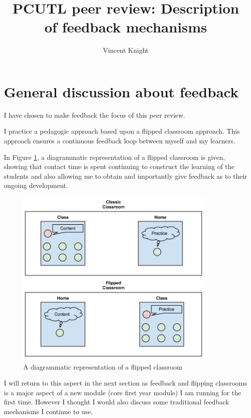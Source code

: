 \documentclass{article}
\title{PCUTL peer review: Description of feedback mechanisms}
\author{Vincent Knight}
\date{}
\begin{document}
\maketitle

\section{General discussion about feedback}

I have chosen to make feedback the focus of this peer review.

I practice a pedagogic approach based upon a flipped classroom approach. This approach ensures a continuous feedback loop between myself and my learners.

In Figure \ref{flipped_classroom_diagram}, a diagrammatic representation of a flipped classroom is given, showing that contact time is spent continuing to construct the learning of the students and also allowing me to obtain and importantly give feedback as to their ongoing development.

\begin{figure}[htdp]
\begin{center}
\includegraphics[width=10cm]{./Images/flipped_classroom_diagram.png}
\end{center}
\caption{A diagrammatic representation of a flipped classroom}\label{flipped_classroom_diagram}
\end{figure}

I will return to this aspect in the next section as feedback and flipping classrooms is a major aspect of a new module (core first year module) I am running for the first time. However I thought I would also discuss some traditional feedback mechanisms I continue to use.
\end{document}
